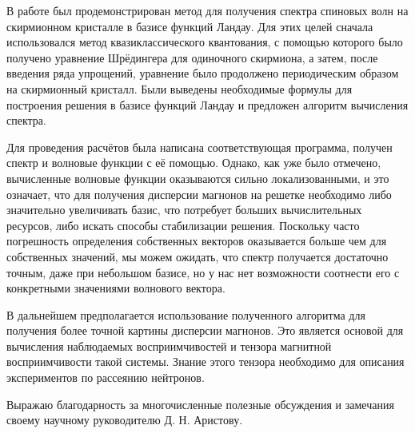 \documentclass[a4paper,article,14pt]{extarticle}
\begin{document}
\pagebreak
{}

В работе был продемонстрирован метод для получения спектра спиновых волн на скирмионном кристалле в базисе функций Ландау. Для этих целей сначала использовался метод квазиклассического квантования, с помощью которого было получено уравнение Шрёдингера для одиночного скирмиона, а затем, после введения ряда упрощений, уравнение было продолжено периодическим образом на скирмионный кристалл. Были выведены необходимые формулы для построения решения в базисе функций Ландау и предложен алгоритм вычисления спектра.

Для проведения расчётов была написана соответствующая программа, получен спектр и волновые функции с её помощью. Однако, как уже было отмечено, вычисленные волновые функции оказываются сильно локализованными, и это означает, что для получения дисперсии магнонов на решетке необходимо либо значительно увеличивать базис, что потребует больших вычислительных ресурсов, либо искать способы стабилизации решения. Поскольку часто погрешность определения собственных векторов оказывается больше чем для собственных значений, мы можем ожидать, что спектр получается достаточно точным, даже при небольшом базисе, но у нас нет возможности соотнести его с конкретными значениями волнового вектора.

В дальнейшем предполагается использование полученного алгоритма для получения более точной картины дисперсии магнонов. Это является основой для вычисления наблюдаемых восприимчивостей и тензора магнитной восприимчивости такой системы. Знание этого тензора необходимо для описания экспериментов по рассеянию нейтронов.

Выражаю благодарность за многочисленные полезные обсуждения и замечания своему научному руководителю Д. Н. Аристову.
\end{document}
